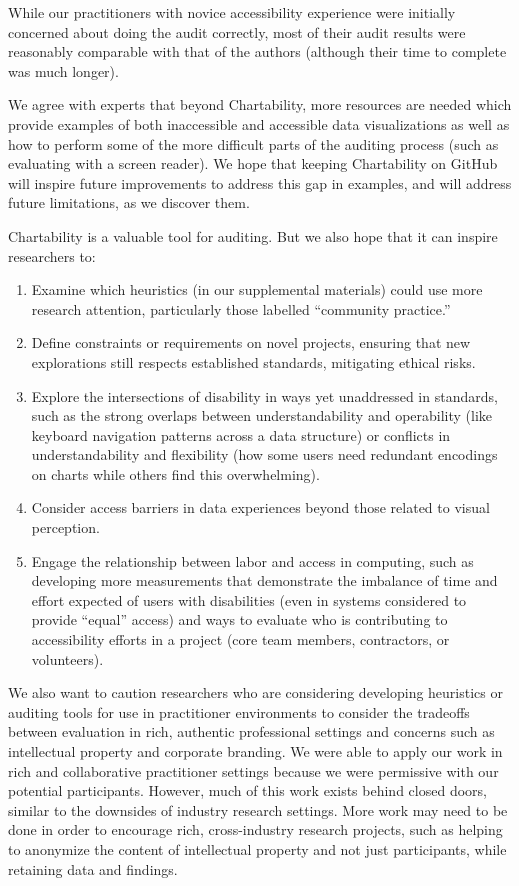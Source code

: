 \documentclass{egpubl}
\begin{document}
While our practitioners with novice accessibility experience were initially concerned about doing the audit correctly, most of their audit results were reasonably comparable with that of the authors (although their time to complete was much longer). 

We agree with experts that beyond Chartability, more resources are needed which provide examples of both inaccessible and accessible data visualizations as well as how to perform some of the more difficult parts of the auditing process (such as evaluating with a screen reader). We hope that keeping Chartability on GitHub will inspire future improvements to address this gap in examples, and will address future limitations, as we discover them. 

Chartability is a valuable tool for auditing. But we also hope that it can inspire researchers to:
\begin{enumerate}
    \item Examine which heuristics (in our supplemental materials) could use more research attention, particularly those labelled ``community practice.''
    \item Define constraints or requirements on novel projects, ensuring that new explorations still respects established standards, mitigating ethical risks.
    \item Explore the intersections of disability in ways yet unaddressed in standards, such as the strong overlaps between understandability and operability (like keyboard navigation patterns across a data structure) or conflicts in understandability and flexibility (how some users need redundant encodings on charts while others find this overwhelming).
    \item Consider access barriers in data experiences beyond those related to visual perception.
    \item Engage the relationship between labor and access in computing, such as developing more measurements that demonstrate the imbalance of time and effort expected of users with disabilities (even in systems considered to provide ``equal'' access) and ways to evaluate who is contributing to accessibility efforts in a project (core team members, contractors, or volunteers).
\end{enumerate}

We also want to caution researchers who are considering developing heuristics or auditing tools for use in practitioner environments to consider the tradeoffs between evaluation in rich, authentic professional settings and concerns such as intellectual property and corporate branding. We were able to apply our work in rich and collaborative practitioner settings because we were permissive with our potential participants. However, much of this work exists behind closed doors, similar to the downsides of industry research settings. More work may need to be done in order to encourage rich, cross-industry research projects, such as helping to anonymize the content of intellectual property and not just participants, while retaining data and findings. 
\end{document}
